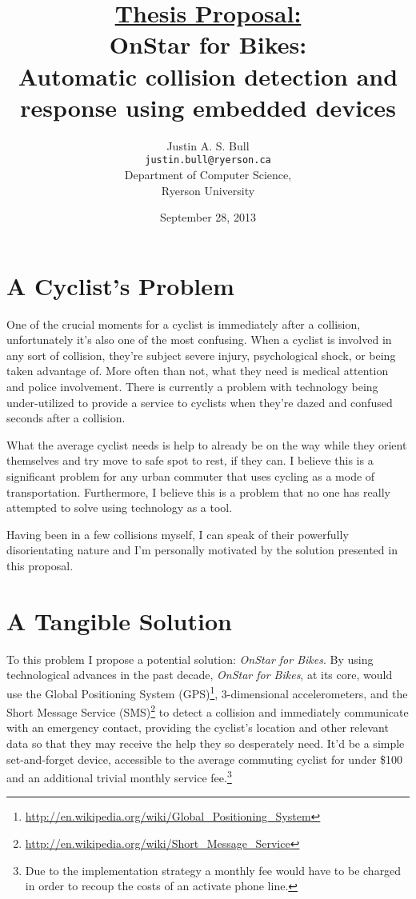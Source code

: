 \documentclass[titlepage]{article}
\title{\underline{Thesis Proposal:}\\
	\vspace{12pt}
	OnStar for Bikes:\\
	Automatic collision detection and response using embedded devices}
\author{Justin A. S. Bull\\
	\texttt{justin.bull@ryerson.ca}\\
	Department of Computer Science,\\
	Ryerson University\\}
\date{September 28, 2013}
\newcommand{\onstar}{{\em OnStar for Bikes}}
\begin{document}
\maketitle

\section{A Cyclist's Problem}
One of the crucial moments for a cyclist is immediately after a collision, unfortunately it's also one of the most confusing. When a cyclist is involved in any sort of collision, they're subject severe injury, psychological shock, or being taken advantage of. More often than not, what they need is medical attention and police involvement. There is currently a problem with technology being under-utilized to provide a service to cyclists when they're dazed and confused seconds after a collision.

What the average cyclist needs is help to already be on the way while they orient themselves and try move to safe spot to rest, if they can. I believe this is a significant problem for any urban commuter that uses cycling as a mode of transportation. Furthermore, I believe this is a problem that no one has really attempted to solve using technology as a tool.

Having been in a few collisions myself, I can speak of their powerfully disorientating nature and I'm personally motivated by the solution presented in this proposal.

\section{A Tangible Solution}
To this problem I propose a potential solution: \onstar. By using technological advances in the past decade, \onstar, at its core, would use the Global Positioning System (GPS)\footnote{\url{http://en.wikipedia.org/wiki/Global_Positioning_System}}, 3-dimensional accelerometers, and the Short Message Service (SMS)\footnote{\url{http://en.wikipedia.org/wiki/Short_Message_Service}} to detect a collision and immediately communicate with an emergency contact, providing the cyclist's location and other relevant data so that they may receive the help they so desperately need. It'd be a simple set-and-forget device, accessible to the average commuting cyclist for under \$100 and an additional trivial monthly service fee.\footnote{Due to the implementation strategy a monthly fee would have to be charged in order to recoup the costs of an activate phone line.}
\end{document}
